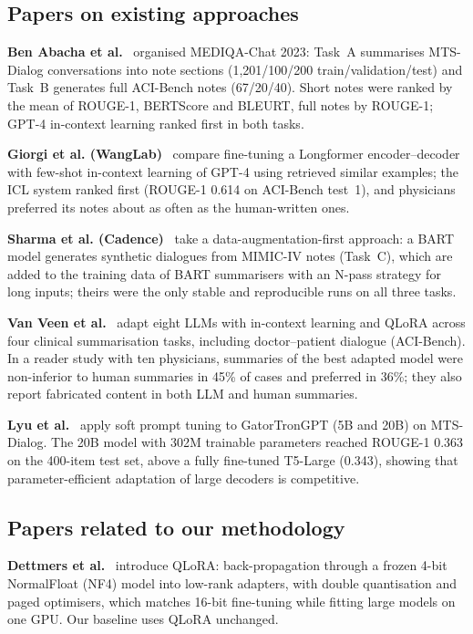 \documentclass[conference]{IEEEtran}
\begin{document}
\subsection{Papers on existing approaches}
\textbf{Ben Abacha et al.}~\cite{abacha2023overview} organised MEDIQA-Chat 2023: Task~A summarises
MTS-Dialog conversations into note sections (1,201/100/200 train/validation/test) and Task~B generates full
ACI-Bench notes (67/20/40). Short notes were ranked by the mean of ROUGE-1, BERTScore and BLEURT, full
notes by ROUGE-1; GPT-4 in-context learning ranked first in both tasks.

\textbf{Giorgi et al. (WangLab)}~\cite{giorgi2023wanglab} compare fine-tuning a Longformer
encoder--decoder with few-shot in-context learning of GPT-4 using retrieved similar examples; the ICL system
ranked first (ROUGE-1 0.614 on ACI-Bench test~1), and physicians preferred its notes about as often as the
human-written ones.

\textbf{Sharma et al. (Cadence)}~\cite{sharma2023cadence} take a data-augmentation-first approach: a
BART model generates synthetic dialogues from MIMIC-IV notes (Task~C), which are added to the training data
of BART summarisers with an N-pass strategy for long inputs; theirs were the only stable and reproducible
runs on all three tasks.

\textbf{Van Veen et al.}~\cite{vanveen2024} adapt eight LLMs with in-context learning and QLoRA across four
clinical summarisation tasks, including doctor--patient dialogue (ACI-Bench). In a reader study with ten
physicians, summaries of the best adapted model were non-inferior to human summaries in 45\% of cases and
preferred in 36\%; they also report fabricated content in both LLM and human summaries.

\textbf{Lyu et al.}~\cite{lyu2024} apply soft prompt tuning to GatorTronGPT (5B and 20B) on MTS-Dialog.
The 20B model with 302M trainable parameters reached ROUGE-1 0.363 on the 400-item test set, above a fully
fine-tuned T5-Large (0.343), showing that parameter-efficient adaptation of large decoders is competitive.

\subsection{Papers related to our methodology}
\textbf{Dettmers et al.}~\cite{dettmers2023qlora} introduce QLoRA: back-propagation through a frozen
4-bit NormalFloat (NF4) model into low-rank adapters, with double quantisation and paged optimisers, which
matches 16-bit fine-tuning while fitting large models on one GPU. Our baseline uses QLoRA unchanged.
\end{document}
